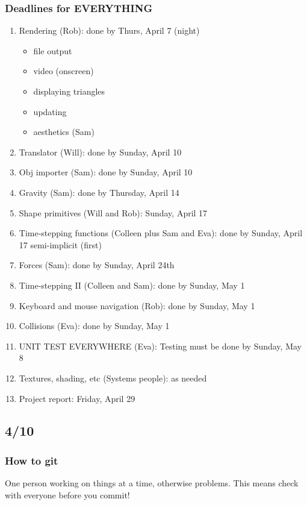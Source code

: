 \subsubsection*{Deadlines for EVERYTHING}
\begin{enumerate}
\item Rendering (Rob): done by Thurs, April 7 (night)
  \begin{itemize}
  \item file output
  \item video (onscreen)
  \item displaying triangles
  \item updating
  \item aesthetics (Sam)
  \end{itemize}

\item Translator (Will): done by Sunday, April 10

\item Obj importer (Sam): done by Sunday, April 10
\item Gravity (Sam): done by Thursday, April 14
\item Shape primitives (Will and Rob): Sunday, April 17
\item Time-stepping functions (Colleen plus Sam and Eva): done by Sunday, April 17
semi-implicit (first)
\item Forces (Sam): done by Sunday, April 24th
\item Time-stepping II (Colleen and Sam): done by Sunday, May 1
\item Keyboard and mouse navigation (Rob): done by Sunday, May 1
\item Collisions (Eva): done by Sunday, May 1
\item UNIT TEST EVERYWHERE (Eva): Testing must be done by Sunday, May 8
\item Textures, shading, etc (Systems people): as needed
\item Project report: Friday, April 29
\end{enumerate}

\subsection*{4/10}

\subsubsection*{How to git}
One person working on things at a time, otherwise problems.  This
means check with everyone before you commit!

